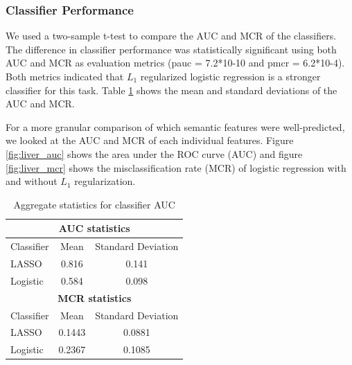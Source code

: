 
\subsubsection{Classifier Performance}

We used a two-sample t-test to compare the AUC and MCR of the classifiers. The difference in classifier performance was statistically significant using both AUC and MCR as evaluation metrics (pauc = 7.2*10-10 and pmcr = 6.2*10-4). Both metrics indicated that $L_1$ regularized logistic regression is a stronger classifier for this task. Table \ref{table:liver_auc_mcr} shows the mean and standard deviations of the AUC and MCR.

For a more granular comparison of which semantic features were well-predicted, we looked at the AUC and MCR of each individual features. Figure \ref{fig:liver_auc} shows the area under the ROC curve (AUC) and figure \ref{fig:liver_mcr} shows the misclassification rate (MCR) of logistic regression with and without $L_1$ regularization.

\begin{table}[h!]
	\centering
	\begin{tabular}{|l|c|c|}
		\hline
		\multicolumn{3}{|c|}{\textbf{AUC statistics}} \\ \hline
		Classifier & Mean & Standard Deviation\\ 
		\hline
		LASSO & 0.816 & 0.141 \\ 
		\hline 
		Logistic & 0.584 & 0.098 \\ 
		\hline \hline
		\multicolumn{3}{|c|}{\textbf{MCR statistics} }\\ 
		\hline
		Classifier & Mean & Standard Deviation\\ 
		\hline
		LASSO & 0.1443 & 0.0881 \\ 
		\hline 
		Logistic & 0.2367 & 0.1085 \\ 
		\hline 
	\end{tabular}
	\caption{Aggregate statistics for classifier AUC}
	\label{table:liver_auc_mcr}
\end{table}


